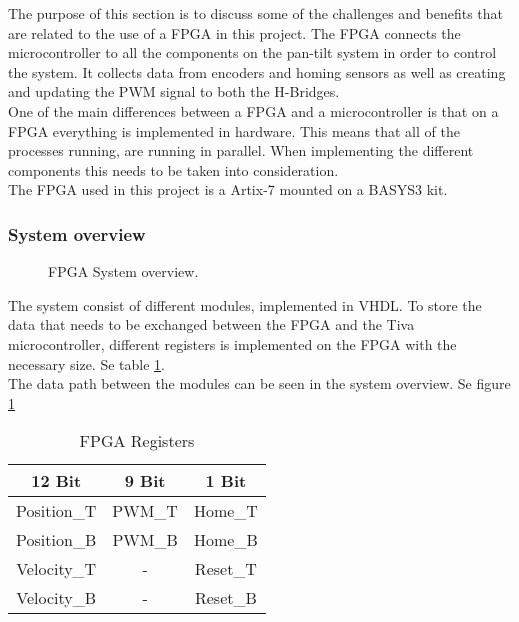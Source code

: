 \documentclass[../../../main]{subfiles}
\begin{document}
The purpose of this section is to discuss some of the challenges and benefits that are related to the use of a FPGA in this project.
The FPGA connects the microcontroller to all the components on the pan-tilt system in order to control the system. It collects data from encoders and homing sensors as well as creating and updating the PWM signal to both the H-Bridges.
\\
One of the main differences between a FPGA and a microcontroller is that on a FPGA everything is implemented in hardware. This means that all of the processes running, are running in parallel. When implementing the different components this needs to be taken into consideration. 
\\
The FPGA used in this project is a Artix-7 mounted on a BASYS3 kit. 
\subsubsection{System overview}%
\label{sub:system_overview}

\begin{figure}[H]
  \centering
  \def\svgwidth{\textwidth}
  
  \caption{FPGA System overview.}
  \label{fig:FPGA_system_overview}
\end{figure}
The system consist of different modules, implemented in VHDL.
To store the data that needs to be exchanged between the FPGA and the Tiva microcontroller, different registers is implemented on the FPGA with the necessary size. Se table \ref{table:FPGA_registers}. 
\\
The data path between the modules can be seen in the system overview. Se figure \ref{fig:FPGA_system_overview}
\begin{table}[H]
\centering
\begin{tabular}{|c|c|c|}
\hline
\textbf{12 Bit} & \textbf{9 Bit} & \textbf{1 Bit} \\ \hline
Position\_T     & PWM\_T         & Home\_T        \\ \hline
Position\_B     & PWM\_B         & Home\_B        \\ \hline
Velocity\_T     & -              & Reset\_T       \\ \hline
Velocity\_B     & -              & Reset\_B       \\ \hline
\end{tabular}
\caption{FPGA Registers}
\label{table:FPGA_registers}
\end{table}
\end{document}
